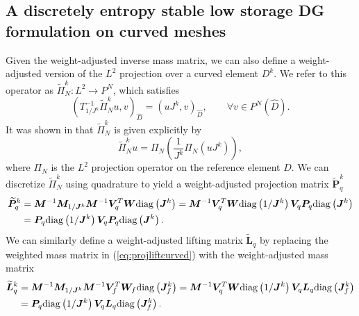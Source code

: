\documentclass[10pt]{amsart}
\theoremstyle{definition}
\theoremstyle{lemma}
\theoremstyle{theorem}
\theoremstyle{assumption}
\renewcommand{\hat}{\widehat}
\renewcommand{\tilde}{\widetilde}
\newcommand{\LRp}[1]{\left( #1 \right)}
\newcommand{\diag}[1]{{\rm diag}\LRp{#1}}
\begin{document}
{\subsection{A discretely entropy stable low storage DG formulation on curved meshes}

Given the weight-adjusted inverse mass matrix, we can also define a weight-adjusted version of the $L^2$ projection over a curved element $D^k$.  We refer to this operator as $\tilde{\Pi}^k_N: L^2\rightarrow P^N$, which satisfies
\[
\LRp{T^{-1}_{1/J^k}\tilde{\Pi}^k_N u,v}_{\hat{D}} = \LRp{uJ^k,v}_{\hat{D}}, \qquad \forall v\in P^N\LRp{\hat{D}}.
\]
It was shown in \cite{chan2016weight2} that $\tilde{\Pi}^k_N $ is given explicitly by
\begin{equation}
\tilde{\Pi}^k_N u = \Pi_N\LRp{\frac{1}{J^k}\Pi_N\LRp{uJ^k}},
\label{eq:wadgprojop}
\end{equation}
where $\Pi_N$ is the $L^2$ projection operator on the reference element $\hat{D}$.  We can discretize $\tilde{\Pi}^k_N$ using quadrature to yield a weight-adjusted projection matrix $\tilde{\bm{P}}^k_q$ 
\begin{align}
\tilde{\bm{P}}^k_q &= \bm{M}^{-1}\bm{M}_{1/\bm{J}^k}\bm{M}^{-1}\bm{V}_q^T\bm{W}\diag{\bm{J}^k} = \bm{M}^{-1}\bm{V}_q^T\bm{W}\diag{1/\bm{J}^k} \bm{V}_q\bm{P}_q\diag{\bm{J}^k} \nonumber\\
&= \bm{P}_q \diag{{1}/{\bm{J}^k}} \bm{V}_q\bm{P}_q \diag{\bm{J}^k}.
\label{eq:wadgproj}
\end{align}
We can similarly define a weight-adjusted lifting matrix $\tilde{\bm{L}}_q$ by replacing the weighted mass matrix in (\ref{eq:projliftcurved}) with the weight-adjusted mass matrix
\begin{align}
\tilde{\bm{L}}^k_q &= \bm{M}^{-1}\bm{M}_{1/\bm{J}^k}\bm{M}^{-1}\bm{V}_f^T\bm{W}_f\diag{\bm{J}^k_f} = \bm{M}^{-1}\bm{V}_q^T\bm{W}\diag{1/\bm{J}^k} \bm{V}_q\bm{L}_q\diag{\bm{J}^k_f} \nonumber\\
&= \bm{P}_q \diag{{1}/{\bm{J}^k}} \bm{V}_q\bm{L}_q \diag{\bm{J}^k_f}.
\label{eq:wadglift}
\end{align}

}
\end{document}
